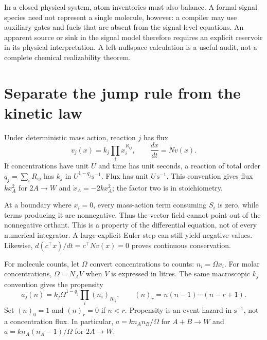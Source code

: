
In a closed physical system, atom inventories must also balance. A formal
signal species need not represent a single molecule, however: a compiler may
use auxiliary gates and fuels that are absent from the signal-level equations.
An apparent source or sink in the signal model therefore requires an explicit
reservoir in its physical interpretation. A left-nullspace calculation is a
useful audit, not a complete chemical realizability theorem.

\section{Separate the jump rule from the kinetic law}

Under deterministic mass action, reaction $j$ has flux
\begin{equation}
 v_j(x)=k_j\prod_i x_i^{R_{ij}},\qquad
 \frac{dx}{dt}=Nv(x).
 \label{eq:ode}
\end{equation}
If concentrations have unit $U$ and time has unit seconds, a reaction of
total order $q_j=\sum_iR_{ij}$ has $k_j$ in
$U^{1-q_j}\mathrm{s}^{-1}$. Flux has unit $U\,\mathrm{s}^{-1}$.
This convention gives flux $kx_A^2$ for $2A\rightarrow W$ and
$\dot x_A=-2kx_A^2$; the factor two is in stoichiometry.

At a boundary where $x_i=0$, every mass-action term consuming $S_i$ is zero,
while terms producing it are nonnegative. Thus the vector field cannot
point out of the nonnegative orthant. This is a property of the differential
equation, not of every numerical integrator. A large explicit Euler step can
still yield negative values. Likewise,
$d(c^\top x)/dt=c^\top Nv(x)=0$ proves continuous conservation.

For molecule counts, let $\Omega$ convert concentrations to counts:
$n_i=\Omega x_i$. For molar concentrations,
$\Omega=N_{\!A}V$ when $V$ is expressed in litres. The same macroscopic
$k_j$ convention gives the propensity
\begin{equation}
 a_j(n)=k_j\Omega^{1-q_j}
 \prod_i(n_i)_{R_{ij}},
 \qquad
 (n)_r=n(n-1)\cdots(n-r+1).
 \label{eq:propensity}
\end{equation}
Set $(n)_0=1$ and $(n)_r=0$ if $n<r$. Propensity is an event hazard in
$\mathrm{s}^{-1}$, not a concentration flux. In particular,
$a=k n_A n_B/\Omega$ for $A+B\rightarrow W$ and
$a=k n_A(n_A-1)/\Omega$ for $2A\rightarrow W$.

